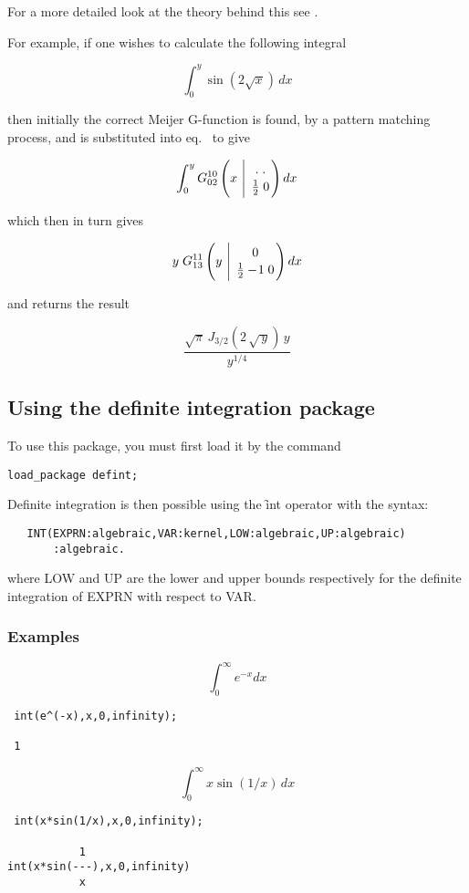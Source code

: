 For a more detailed look at the theory behind this see
\cite{Adamchik90}.

For example, if one wishes to calculate the following integral

\[
\int_{0}^{y} \sin(2 \sqrt{x}) \, dx
\]

then initially the correct Meijer G-function is found, by a pattern
matching process, and is substituted
into eq.~ to give

\[
\int_{0}^{y} G^{1 0}_{0 2}\left(x
\ \Bigg\vert \ \MeijerGparams{. \; .}{\frac{1}{2} \; 0} \right) dx
\]

which then in turn gives

\[
y \; G^{1 1}_{1 3}\left(y \ \Bigg\vert \ \MeijerGparams{0}{\frac{1}{2} -\!1 \; 0} \right) dx
\]

and returns the result

\[
\frac{\sqrt{\pi} \, J_{3/2}(2 \, \sqrt{\,y}) \, y}{y^{1/4}}
\]

\subsection{Using the definite integration package}
To use this package, you must first load it by the command
\begin{verbatim}
load_package defint;
\end{verbatim}
Definite integration is then possible using the \f{int} operator
with the syntax:
\begin{verbatim}
   INT(EXPRN:algebraic,VAR:kernel,LOW:algebraic,UP:algebraic)
       :algebraic.
\end{verbatim}
where LOW and UP are the lower and upper bounds respectively for
the definite integration of EXPRN with respect to VAR.

\subsubsection{Examples}

\[
\int_{0}^{\infty} e^{-x} dx
\]


\begin{verbatim}
 int(e^(-x),x,0,infinity);

 1
\end{verbatim}

\[
\int_{0}^{\infty} x \sin(1/x) \, dx
\]

\begin{verbatim}
 int(x*sin(1/x),x,0,infinity);

           1
int(x*sin(---),x,0,infinity)
           x
\end{verbatim}

